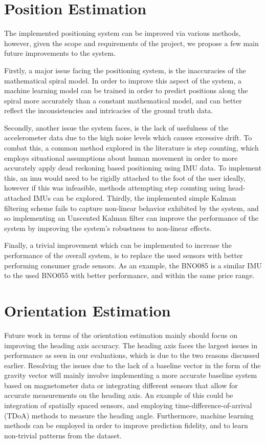 \section{Position Estimation}
The implemented positioning system can be improved via various methods, however, given the scope and requirements of the project, we propose a few main future improvements to the system. 

Firstly, a major issue facing the positioning system, is the inaccuracies of the mathematical spiral model. In order to improve this aspect of the system, a machine learning model can be trained in order to predict positions along the spiral more accurately than a constant mathematical model, and can better reflect the inconsistencies and intricacies of the ground truth data.

Secondly, another issue the system faces, is the lack of usefulness of the accelerometer data due to the high noise levels which causes excessive drift. To combat this, a common method explored in the literature is step counting, which employs situational assumptions about human movement in order to more accurately apply dead reckoning based positioning using IMU data. To implement this, an imu would need to be rigidly attached to the foot of the user ideally, however if this was infeasible, methods attempting step counting using head-attached IMUs can be explored. \cite{huang_2022_improvement, tiwari_2022_a}
Thirdly, the implemented simple Kalman filtering scheme fails to capture non-linear behavior exhibited by the system, and so implementing an Unscented Kalman filter \cite{bernalpolo_2019_kalman} can improve the performance of the system by improving the system's robustness to non-linear effects.

Finally, a trivial improvement which can be implemented to increase the performance of the overall system, is to replace the used sensors with better performing consumer grade sensors. As an example, the BNO085 is a similar IMU to the used BNO055 with better performance, and within the same price range.


\section{Orientation Estimation}
Future work in terms of the orientation estimation mainly should focus on improving the heading axis accuracy. The heading axis faces the largest issues in performance as seen in our evaluations, which is due to the two reasons discussed earlier. Resolving the issues due to the lack of a baseline vector in the form of the gravity vector will mainly involve implementing a more accurate baseline system based on magnetometer data or integrating different sensors that allow for accurate measurements on the heading axis. An example of this could be integration of spatially spaced sensors, and employing time-difference-of-arrival (TDoA) methods to measure the heading angle. \cite{stanculeanu_2012_enhanced} Furthermore, machine learning methods can be employed in order to improve prediction fidelity, and to learn non-trivial patterns from the dataset. \cite{yan_2019_ronin}

